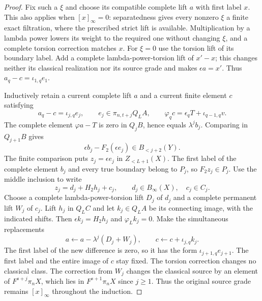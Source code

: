 \begin{proof}
Fix such a $\xi$ and choose its compatible complete lift $a$ with first
label $x$. This also applies when $[x]_\infty=0$: separatedness gives every
nonzero $\xi$ a finite exact filtration, where the prescribed strict lift
is available. Multiplication by a lambda power lowers its weight to the
required one without changing $\xi$, and a complete torsion correction
matches $x$. For $\xi=0$ use the torsion lift of its boundary label.
Add a complete lambda-power-torsion lift of $x'-x$; this changes
neither its classical realization nor its source grade and makes
$\epsilon a=x'$. Thus $a_q-c=\iota_{1,q}e_1$.

Inductively retain a current complete lift $a$ and a current finite element
$c$ satisfying
\[
 a_q-c=\iota_{j,q}e_j,\qquad e_j\in\pi_{n,t+j}Q_LA,
 \qquad \varphi_qc=\epsilon_qT+\iota_{q-1,q}v.
\]
The complete element $\varphi a-T$ is zero in $Q_jB$, hence equals
$\lambda^jb_j$. Comparing in $Q_{j+1}B$ gives
\[
 \epsilon b_j-F_2(\epsilon e_j)\in B_{<j+2}(Y).
\]
The finite comparison puts $z_j=\epsilon e_j$ in $Z_{<L+1}(X)$.
The first label of the complete element $b_j$ and every true boundary
belong to $P_j$, so $F_2z_j\in P_j$.
Use the middle inclusion to write
\[
 z_j=d_j+H_2h_j+c_j,\qquad d_j\in B_\infty(X),\quad c_j\in C_j.
\]
Choose a complete lambda-power-torsion lift $D_j$ of $d_j$ and a complete
permanent lift $W_j$ of $c_j$. Lift $h_j$ in $Q_LC$ and let $k_j\in Q_LA$
be its connecting image, with the indicated shifts. Then
$\epsilon k_j=H_2h_j$ and $\varphi_Lk_j=0$.
Make the simultaneous replacements
\[
 a\longleftarrow a-\lambda^j(D_j+W_j),\qquad
 c\longleftarrow c+\iota_{j,q}k_j.
\]
The first label of the new difference is zero, so it has the form
$\iota_{j+1,q}e_{j+1}$. The first label and the entire image of $c$ stay
fixed. The torsion correction changes no classical class. The correction
from $W_j$ changes the classical source by an element of $F^{s+j}\pi_nX$,
which lies in $F^{s+1}\pi_nX$ since $j\geq1$. Thus the original source
grade remains $[x]_\infty$ throughout the induction.


\end{proof}
